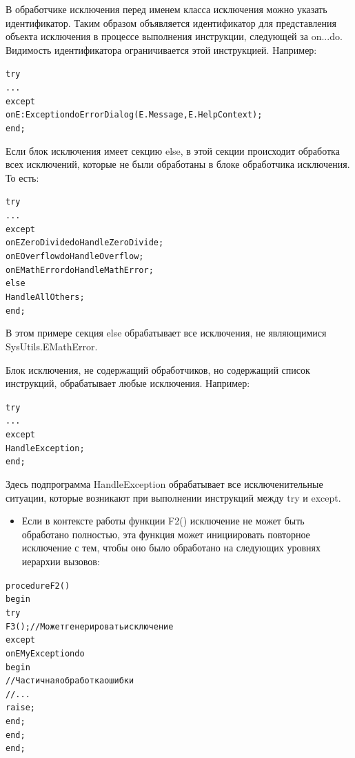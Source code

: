 \documentclass{beamer}
\begin{document}
\begin{frame}[fragile]
В обработчике исключения перед именем класса исключения можно указать идентификатор. Таким образом объявляется идентификатор для представления объекта исключения в процессе выполнения инструкции, следующей за on...do. Видимость идентификатора ограничивается этой инструкцией. Например:
\begin{alltt}
try
  ...
except
  on E: Exception do ErrorDialog(E.Message, E.HelpContext);
end;
\end{alltt}
\end{frame}

\begin{frame}[fragile]
Если блок исключения имеет секцию else, в этой секции происходит обработка всех исключений, которые не были обработаны в блоке обработчика исключения. То есть:
\begin{alltt}
try
  ...
except
  on EZeroDivide do HandleZeroDivide;
  on EOverflow do HandleOverflow;
  on EMathError do HandleMathError;
else
  HandleAllOthers;
end;
\end{alltt}
В этом примере секция else обрабатывает все исключения, не являющимися SysUtils.EMathError.
\end{frame}

\begin{frame}[fragile]
Блок исключения, не содержащий обработчиков, но содержащий список инструкций, обрабатывает любые исключения. Например:
\begin{alltt}
try
   ...
except
   HandleException;
end;
\end{alltt}
Здесь подпрограмма HandleException обрабатывает все исключенительные ситуации, которые возникают при выполнении инструкций между try и except.
\end{frame}

\begin{frame}[fragile]
\begin{itemize}
\item Если в контексте работы функции F2() исключение не может быть обработано полностью, эта функция может инициировать повторное исключение с тем, чтобы оно было обработано на следующих уровнях иерархии вызовов:
\end{itemize}
\begin{alltt}
procedure F2()
begin
  try 
    F3(); // Может генерировать исключение
  except
    on EMyException do 
      begin 
        // Частичная обработка ошибки
        // ...
        raise;
      end;
  end;
end;
\end{alltt}
\end{frame}
\end{document}
